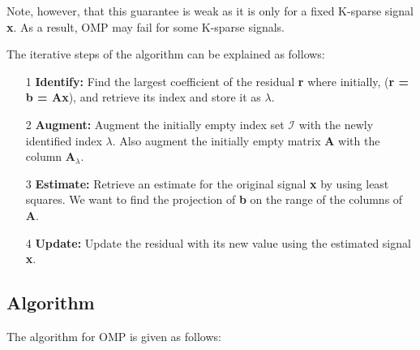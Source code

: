 \documentclass[titlepage,oneside, 12pt]{book}
\theoremstyle{break}
\begin{document}
Note, however, that this guarantee is weak as it is only for a fixed K-sparse signal \textbf{x}. As a result, OMP may fail for some K-sparse signals.

\bigskip
The iterative steps of the algorithm can be explained as follows:

\begin{itemize}
\item[1] \textbf{Identify:} Find the largest coefficient of the residual \textbf{r} where initially, (\textbf{r = b = Ax}), and retrieve its index and store it as $\lambda$. 

\item[2] \textbf{Augment:} Augment the initially empty index set $\pmb{\mathcal{I}}$ with the newly identified index $\lambda$. Also augment the initially empty matrix \textbf{A} with the column $\textbf{A}_{\lambda}$.

\item[3] \textbf{Estimate:} Retrieve an estimate for the original signal \textbf{x} by using least squares. We want to find the projection of \textbf{b}  on the range of the columns of \textbf{A}. 

\item[4] \textbf{Update:} Update the residual with its new value using the estimated signal \textbf{x}.


\end{itemize}
\newpage
\subsection{Algorithm}
The algorithm for OMP is given as follows: 
\end{document}

